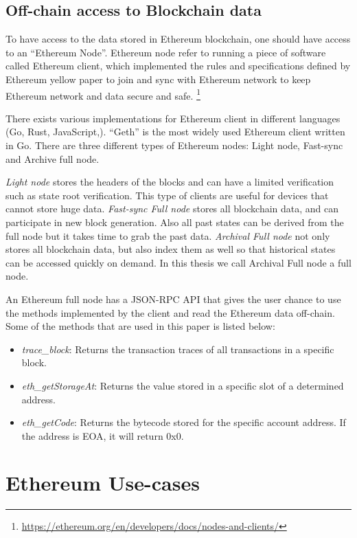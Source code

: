 \subsection{Off-chain access to Blockchain data}

To have access to the data stored in Ethereum blockchain, one should have access to an ``Ethereum Node''. Ethereum node refer to running a piece of software called Ethereum client, which implemented the rules and specifications defined by Ethereum yellow paper  to join and sync with Ethereum network to keep Ethereum network and data secure and safe.
\footnote{\url{https://ethereum.org/en/developers/docs/nodes-and-clients/}} 

There exists various implementations for Ethereum client in different languages (\eg Go, Rust, JavaScript,\etc). ``Geth'' is the most widely used Ethereum client written in Go. 
There are three different types of Ethereum nodes: Light node, Fast-sync and Archive full node.

\textit{Light node} stores the headers of the blocks and can have a limited verification such as state root verification. This type of clients are useful for devices that cannot store huge data.
\textit{Fast-sync Full node} stores all blockchain data, and can participate in new block generation. Also all past states can be derived from the full node but it takes time to grab the past data.
\textit{Archival Full node} not only stores all blockchain data, but also index them as well so that historical states can be accessed quickly on demand. In this thesis we call Archival Full node a
full node. 

An Ethereum full node has a JSON-RPC API that gives the user chance to use the methods implemented by the client and read the Ethereum data off-chain. Some of the methods that are used in this paper is listed below:

\begin{itemize}
    \item \emph{trace\_block}: Returns the transaction traces of all transactions in a specific block.
    \item \emph{eth\_getStorageAt}: Returns the value stored in a specific slot of a determined address. 
    \item \emph{eth\_getCode}: Returns the bytecode stored for the specific account address. If the address is EOA, it will return 0x0.
\end{itemize}

\section{Ethereum Use-cases}

